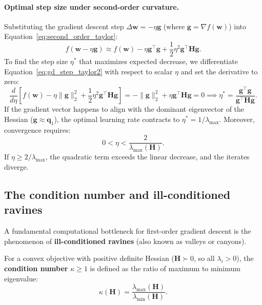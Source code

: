 \paragraph{Optimal step size under second-order curvature.}
Substituting the gradient descent step $\Delta \mathbf{w} = -\eta \mathbf{g}$ (where $\mathbf{g} = \nabla f(\mathbf{w})$) into Equation~\eqref{eq:second_order_taylor}:
\begin{equation}
f(\mathbf{w} - \eta \mathbf{g}) \approx f(\mathbf{w}) - \eta \mathbf{g}^\top \mathbf{g} + \frac{1}{2} \eta^2 \mathbf{g}^\top \mathbf{H} \mathbf{g}.
\label{eq:gd_step_taylor2}
\end{equation}
To find the step size $\eta^*$ that maximizes expected decrease, we differentiate Equation~\eqref{eq:gd_step_taylor2} with respect to scalar $\eta$ and set the derivative to zero:
\begin{equation}
\frac{d}{d\eta} \left[ f(\mathbf{w}) - \eta \|\mathbf{g}\|_2^2 + \frac{1}{2} \eta^2 \mathbf{g}^\top \mathbf{H} \mathbf{g} \right] = -\|\mathbf{g}\|_2^2 + \eta \mathbf{g}^\top \mathbf{H} \mathbf{g} = 0 \implies \eta^* = \frac{\mathbf{g}^\top \mathbf{g}}{\mathbf{g}^\top \mathbf{H} \mathbf{g}}.
\label{eq:optimal_eta_hessian}
\end{equation}
If the gradient vector happens to align with the dominant eigenvector of the Hessian ($\mathbf{g} \approx \mathbf{q}_1$), the optimal learning rate contracts to $\eta^* = 1/\lambda_{\max}$. Moreover, convergence requires:
\begin{equation}
0 < \eta < \frac{2}{\lambda_{\max}(\mathbf{H})}.
\label{eq:learning_rate_stability_bound}
\end{equation}
If $\eta \ge 2/\lambda_{\max}$, the quadratic term exceeds the linear decrease, and the iterates diverge.

\subsection{The condition number and ill-conditioned ravines}
\label{sec:condition_number_ravines}

A fundamental computational bottleneck for first-order gradient descent is the phenomenon of \textbf{ill-conditioned ravines} (also known as valleys or canyons).

\begin{definition}
For a convex objective with positive definite Hessian ($\mathbf{H} \succ 0$, so all $\lambda_i > 0$), the \textbf{condition number} $\kappa \ge 1$ is defined as the ratio of maximum to minimum eigenvalue:
\begin{equation}
\kappa(\mathbf{H}) = \frac{\lambda_{\max}(\mathbf{H})}{\lambda_{\min}(\mathbf{H})}.
\label{eq:condition_number_def}
\end{equation}
\end{definition}

